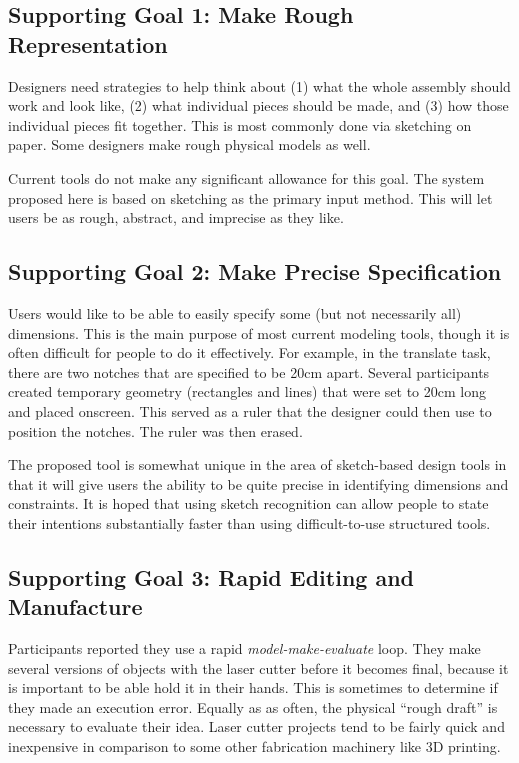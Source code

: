 \documentclass[12pt]{article}
\begin{document}
\subsection{Supporting Goal 1: Make Rough Representation} 

Designers need strategies to help think about (1) what the whole
assembly should work and look like, (2) what individual pieces should
be made, and (3) how those individual pieces fit together. This is
most commonly done via sketching on paper. Some designers make
rough physical models as well.

Current tools do not make any significant allowance for this goal. The
system proposed here is based on sketching as the primary input
method. This will let users be as rough, abstract, and imprecise as
they like.

\subsection{Supporting Goal 2: Make Precise Specification}

Users would like to be able to easily specify some (but not
necessarily all) dimensions. This is the main purpose of most current
modeling tools, though it is often difficult for people to do it
effectively. For example, in the translate task, there are two notches
that are specified to be 20cm apart. Several participants created
temporary geometry (rectangles and lines) that were set to 20cm long
and placed onscreen. This served as a ruler that the designer could
then use to position the notches. The ruler was then erased.

The proposed tool is somewhat unique in the area of sketch-based
design tools in that it will give users the ability to be quite
precise in identifying dimensions and constraints. It is hoped that
using sketch recognition can allow people to state their intentions
substantially faster than using difficult-to-use structured tools.

\subsection{Supporting Goal 3: Rapid Editing and Manufacture}

Participants reported they use a rapid \textit{model-make-evaluate}
loop. They make several versions of objects with the laser cutter
before it becomes final, because it is important to be able hold it in
their hands. This is sometimes to determine if they made an execution
error. Equally as as often, the physical ``rough draft'' is necessary
to evaluate their idea. Laser cutter projects tend to be fairly quick
and inexpensive in comparison to some other fabrication machinery like
3D printing.
\end{document}
